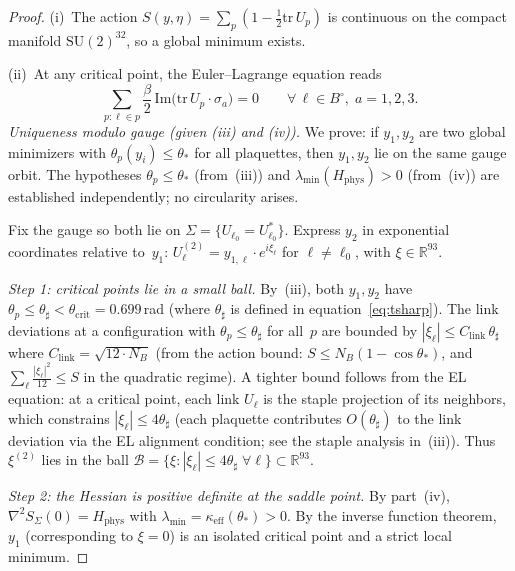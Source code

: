 \documentclass[11pt]{article}
\theoremstyle{definition}
\newcommand{\SU}{\mathrm{SU}}
\newcommand{\tr}{\mathrm{tr}}
\newcommand{\R}{\mathbb{R}}
\begin{document}
\begin{proof}
(i)~The action $S(y,\eta)=\sum_p(1-\frac{1}{2}\tr\,U_p)$ is
continuous on the compact manifold $\SU(2)^{32}$, so a global
minimum exists.

(ii)~At any critical point, the Euler--Lagrange equation reads
\begin{equation}\label{eq:EL}
\sum_{p:\ell\in p}\frac{\beta}{2}\,\mathrm{Im}
\bigl(\tr\,U_p\cdot\sigma_a\bigr)=0
\qquad\forall\,\ell\in B^\circ,\;a=1,2,3.
\end{equation}
\emph{Uniqueness modulo gauge (given (iii) and (iv)).}
We prove: if $y_1,y_2$ are two global minimizers with
$\theta_p(y_i)\le\theta_*$ for all plaquettes, then $y_1,y_2$
lie on the same gauge orbit.  The hypotheses
$\theta_p\le\theta_*$ (from~(iii)) and
$\lambda_{\min}(H_{\mathrm{phys}})>0$ (from~(iv)) are
established independently; no circularity arises.

Fix the gauge so both lie on
$\Sigma=\{U_{\ell_0}=U_{\ell_0}^*\}$.  Express $y_2$
in exponential coordinates relative to~$y_1$:
$U_\ell^{(2)}=y_{1,\ell}\cdot e^{i\xi_\ell}$ for
$\ell\ne\ell_0$, with $\xi\in\R^{93}$.

\emph{Step 1: critical points lie in a small ball.}
By~(iii), both $y_1,y_2$ have $\theta_p\le\theta_\sharp
<\theta_{\mathrm{crit}}=0.699$\,rad (where $\theta_\sharp$
is defined in equation~\eqref{eq:tsharp}).
The link deviations at a configuration with
$\theta_p\le\theta_\sharp$ for all~$p$ are bounded by
$|\xi_\ell|\le C_{\mathrm{link}}\,\theta_\sharp$ where
$C_{\mathrm{link}}=\sqrt{12\cdot N_B}$
(from the action bound: $S\le N_B(1-\cos\theta_*)$,
and $\sum_\ell\frac{|\xi_\ell|^2}{12}
\le S$ in the quadratic regime).
A tighter bound follows from the EL equation:
at a critical point, each link $U_\ell$ is the staple
projection of its neighbors, which constrains
$|\xi_\ell|\le 4\theta_\sharp$ (each plaquette contributes
$O(\theta_\sharp)$ to the link deviation via the EL alignment
condition; see the staple analysis in~(iii)).
Thus $\xi^{(2)}$ lies in the ball
$\mathcal{B}=\{\xi:|\xi_\ell|\le 4\theta_\sharp\;\forall\ell\}
\subset\R^{93}$.

\emph{Step 2: the Hessian is positive definite at the saddle point.}
By part~(iv), $\nabla^2 S_\Sigma(0)=H_{\mathrm{phys}}$ with
$\lambda_{\min}=\kappa_{\mathrm{eff}}(\theta_*)>0$.
By the inverse function theorem, $y_1$ (corresponding to $\xi=0$)
is an isolated critical point and a strict local minimum.


\end{proof}
\end{document}
